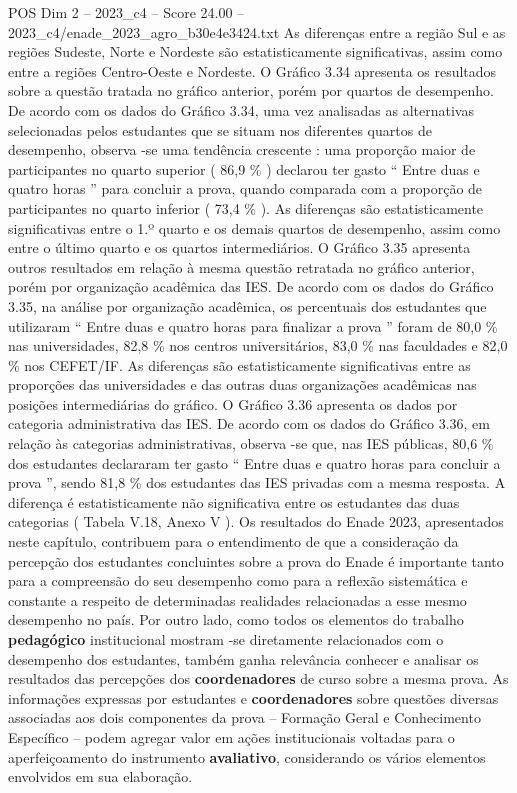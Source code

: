 \begin{textsample}{POS Dim 2 – 2023\_c4 – Score 24.00 – 2023\_c4/enade\_2023\_agro\_b30e4e3424.txt}
As diferenças entre a região Sul e as regiões Sudeste, Norte e Nordeste são estatisticamente significativas, assim como entre a regiões Centro-Oeste e Nordeste.
O Gráfico 3.34 apresenta os resultados sobre a questão tratada no gráfico anterior, porém por quartos de desempenho.
De acordo com os dados do Gráfico 3.34, uma vez analisadas as alternativas selecionadas pelos estudantes que se situam nos diferentes quartos de desempenho, observa -se uma tendência crescente : uma proporção maior de participantes no quarto superior ( 86,9 \% ) declarou ter gasto “ Entre duas e quatro horas ” para concluir a prova, quando comparada com a proporção de participantes no quarto inferior ( 73,4 \% ).
As diferenças são estatisticamente significativas entre o 1.º quarto e os demais quartos de desempenho, assim como entre o último quarto e os quartos intermediários.
O Gráfico 3.35 apresenta outros resultados em relação à mesma questão retratada no gráfico anterior, porém por organização acadêmica das IES.
De acordo com os dados do Gráfico 3.35, na análise por organização acadêmica, os percentuais dos estudantes que utilizaram “ Entre duas e quatro horas para finalizar a prova ” foram de 80,0 \% nas universidades, 82,8 \% nos centros universitários, 83,0 \% nas faculdades e 82,0 \% nos CEFET/IF.
As diferenças são estatisticamente significativas entre as proporções das universidades e das outras duas organizações acadêmicas nas posições intermediárias do gráfico.
O Gráfico 3.36 apresenta os dados por categoria administrativa das IES.
De acordo com os dados do Gráfico 3.36, em relação às categorias administrativas, observa -se que, nas IES públicas, 80,6 \% dos estudantes declararam ter gasto “ Entre duas e quatro horas para concluir a prova ”, sendo 81,8 \% dos estudantes das IES privadas com a mesma resposta.
A diferença é estatisticamente não significativa entre os estudantes das duas categorias ( Tabela V.18, Anexo V ).
Os resultados do Enade 2023, apresentados neste capítulo, contribuem para o entendimento de que a consideração da percepção dos estudantes concluintes sobre a prova do Enade é importante tanto para a compreensão do seu desempenho como para a reflexão sistemática e constante a respeito de determinadas realidades relacionadas a esse mesmo desempenho no país.
Por outro lado, como todos os elementos do trabalho \textbf{pedagógico} institucional mostram -se diretamente relacionados com o desempenho dos estudantes, também ganha relevância conhecer e analisar os resultados das percepções dos \textbf{coordenadores} de curso sobre a mesma prova.
As informações expressas por estudantes e \textbf{coordenadores} sobre questões diversas associadas aos dois componentes da prova – Formação Geral e Conhecimento Específico – podem agregar valor em ações institucionais voltadas para o aperfeiçoamento do instrumento \textbf{avaliativo}, considerando os vários elementos envolvidos em sua elaboração.

\end{textsample}
